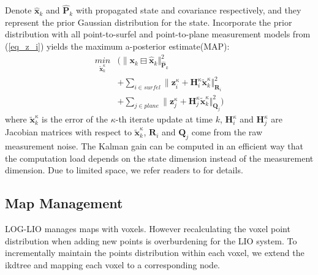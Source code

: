 \documentclass[letterpaper, 10 pt, conference]{ieeeconf}  %
\begin{document}
Denote $\widehat{\mathbf{x}}_{k}$ and $\widehat{\mathbf{P}}_{k}$ with propagated state and covariance respectively, and they represent the prior Gaussian distribution for the state.
Incorporate the prior distribution with all point-to-surfel and point-to-plane measurement models from (\ref{eq_z_i}) yields the maximum a-posterior estimate(MAP):
\begin{equation}
        \begin{aligned}
                \underset{\widetilde{\mathbf{x}}_k^\kappa}{min} & ( \|\mathbf{x}_{k}\boxminus \widehat{\mathbf{x}}_k\Vert^2_{\widehat{\mathbf{P}}_k}                                     \\
                                                                & +\sum_{i\in surfel} \|\mathbf{z}_i^\kappa + \mathbf{H}_i^\kappa \widetilde{\mathbf{x}}_k^\kappa \Vert_{\mathbf{R}_i}^2 \\
                                                                & +\sum_{j\in plane} \|\mathbf{z}_j^\kappa + \mathbf{H}_j^\kappa \widetilde{\mathbf{x}}_k^\kappa \Vert_{\mathbf{Q}_j}^2)
        \end{aligned}
        \label{eq_map}
\end{equation}
where $\widetilde{\mathbf{x}}_k^\kappa$ is the error of the $\kappa$-th iterate update at time $k$, $\mathbf{H}_i^\kappa$ and $\mathbf{H}_j^\kappa$ are Jacobian matrices with respect to $\widetilde{\mathbf{x}}_k^\kappa$, $\mathbf{R}_i$ and $\mathbf{Q}_j$ come from the raw measurement noise.
The Kalman gain can be computed in an efficient way that the computation load depends on the state dimension instead of the measurement dimension.
Due to limited space, we refer readers to \cite{xu2021fast,xu2022fast} for details.

\subsection{Map Management}
\label{sec:map_management}
LOG-LIO manages maps with voxels.
However recalculating the voxel point distribution when adding new points is overburdening for the LIO system.
To incrementally maintain the points distribution within each voxel, we extend the ikdtree and mapping each voxel to a corresponding node.

\end{document}
